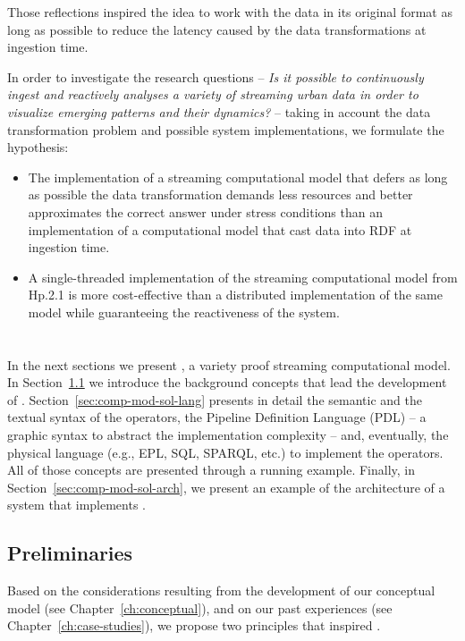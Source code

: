 Those reflections inspired the idea to work with the data in its original format as long as possible to reduce the latency caused by the data transformations at ingestion time.

In order to investigate the research questions -- \textit{Is it possible to continuously ingest and reactively analyses a variety of streaming urban data in order to visualize emerging patterns and their dynamics?} -- taking in account the data transformation problem and possible system implementations, we formulate the hypothesis: 
\begin{itemize}[leftmargin=42pt]
\item[\textsf{Hp.2.1}] The implementation of a streaming computational model that defers as long as possible the data transformation demands less resources and better approximates the correct answer under stress conditions than an implementation of a computational model that cast data into RDF at ingestion time.
\item[\textsf{Hp.2.2}] A single-threaded implementation of the streaming computational model from \textsf{Hp.2.1} is more cost-effective than a distributed implementation of the same model while guaranteeing the reactiveness of the system.
\end{itemize}

\section{\texorpdfstring{\protect\river{}}{RIVER}}\label{sec:comp-mod-sol}
In the next sections we present \river{}, a variety proof streaming computational model.
In Section~\ref{sec:comp-mod-sol-pre} we introduce the background concepts that lead the development of \river{}.
Section~\ref{sec:comp-mod-sol-lang} presents in detail the semantic and the textual syntax of the \river{} operators, the Pipeline Definition Language (PDL) -- a graphic syntax to abstract the implementation complexity -- and, eventually, the physical language (e.g., EPL, SQL, SPARQL, etc.) to implement the operators. All of those concepts are presented through a running example.
Finally, in Section~\ref{sec:comp-mod-sol-arch}, we present an example of the architecture of a system that implements \river{}.

\subsection{Preliminaries}\label{sec:comp-mod-sol-pre}
Based on the considerations resulting from the development of our conceptual model (see Chapter~\ref{ch:conceptual}), and on our past experiences (see Chapter~\ref{ch:case-studies}), we propose two principles that inspired \river{}.

